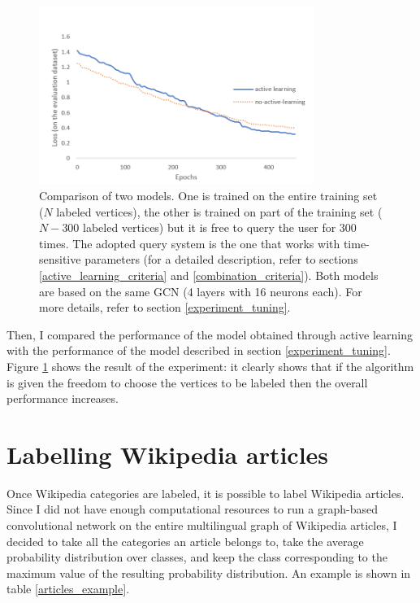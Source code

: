             \begin{figure}
                \centering
                \includegraphics[width=0.8\textwidth]{images/active_experiment.PNG}
                \caption{Comparison of two models. One is trained on the entire training set (\(N\) labeled vertices), the other is trained on part of the training set (\(N-300\) labeled vertices) but it is free to query the user for 300 times. The adopted query system is the one that works with time-sensitive parameters (for a detailed description, refer to sections \ref{active_learning_criteria} and \ref{combination_criteria}). Both models are based on the same GCN (4 layers with 16 neurons each). For more details, refer to section \ref{experiment_tuning}.}
                \label{active_experiment}
            \end{figure}
            
            Then, I compared the performance of the model obtained through active learning with the performance of the model described in section \ref{experiment_tuning}. Figure \ref{active_experiment} shows the result of the experiment: it clearly shows that if the algorithm is given the freedom to choose the vertices to be labeled then the overall performance increases.
    \section{Labelling Wikipedia articles}
        Once Wikipedia categories are labeled, it is possible to label Wikipedia articles. Since I did not have enough computational resources to run a graph-based convolutional network on the entire multilingual graph of Wikipedia articles, I decided to take all the categories an article belongs to, take the average probability distribution over classes, and keep the class corresponding to the maximum value of the resulting probability distribution. An example is shown in table \ref{articles_example}.
        
